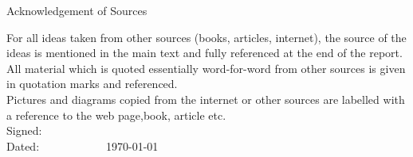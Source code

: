 \documentclass[12pt, a4paper, pdflatex, leqno]{report}
\begin{document}
\begin{center}Acknowledgement of Sources\\[2cm]\end{center}
For all ideas taken from other sources (books, articles, internet), the source of the ideas is mentioned in the main text and fully referenced at the end of the report.\\[0.5cm]
All material which is quoted essentially word-for-word from other sources is given in quotation marks and referenced.\\[.5cm]
Pictures and diagrams copied from the internet or other sources are labelled with a reference to the web page,book, article etc.\\[2cm]
Signed:\\[1cm]
Dated:~~~~~~~~~~~~\today

\thispagestyle{empty}
\cleardoublepage
\pagestyle{plain}
\vfill



\end{document}
